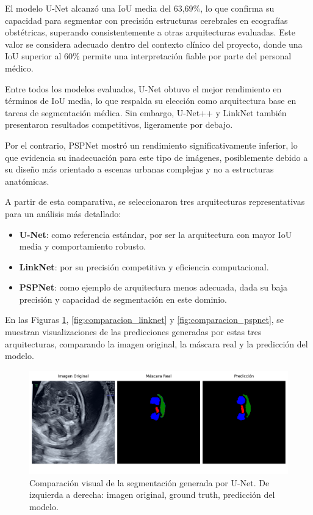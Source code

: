 El modelo U-Net alcanzó una IoU media del 63,69\%, lo que confirma su capacidad para segmentar con precisión estructuras cerebrales en ecografías obstétricas, superando consistentemente a otras arquitecturas evaluadas. Este valor se considera adecuado dentro del contexto clínico del proyecto, donde una IoU superior al 60\% permite una interpretación fiable por parte del personal médico.

Entre todos los modelos evaluados, U-Net obtuvo el mejor rendimiento en términos de IoU media, lo que respalda su elección como arquitectura base en tareas de segmentación médica. Sin embargo, U-Net++ y LinkNet también presentaron resultados competitivos, ligeramente por debajo.

Por el contrario, PSPNet mostró un rendimiento significativamente inferior, lo que evidencia su inadecuación para este tipo de imágenes, posiblemente debido a su diseño más orientado a escenas urbanas complejas y no a estructuras anatómicas.

A partir de esta comparativa, se seleccionaron tres arquitecturas representativas para un análisis más detallado:

\begin{itemize}
    \item \textbf{U-Net}: como referencia estándar, por ser la arquitectura con mayor IoU media y comportamiento robusto.
    \item \textbf{LinkNet}: por su precisión competitiva y eficiencia computacional.
    \item \textbf{PSPNet}: como ejemplo de arquitectura menos adecuada, dada su baja precisión y capacidad de segmentación en este dominio.
\end{itemize}

En las Figuras \ref{fig:comparacion_unet}, \ref{fig:comparacion_linknet} y \ref{fig:comparacion_pspnet}, se muestran visualizaciones de las predicciones generadas por estas tres arquitecturas, comparando la imagen original, la máscara real y la predicción del modelo.

\begin{figure}[h]
    \centering
    \includegraphics[width=1\textwidth]{img/image1_unet.png}
    \caption{Comparación visual de la segmentación generada por U-Net. De izquierda a derecha: imagen original, ground truth, predicción del modelo. }
    \label{fig:comparacion_unet}
\end{figure}

